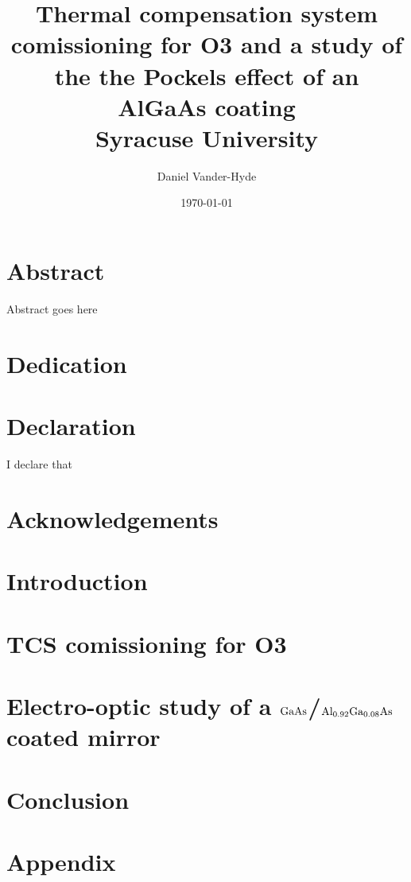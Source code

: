 \documentclass[12pt]{report}
\title{
{Thermal compensation system comissioning for O3 and a study of the
the Pockels effect of an AlGaAs coating}\\
{\large Syracuse University}\\
}
\author{Daniel Vander-Hyde}
\date{\today}
\newcommand{\algaas}{\mathrm{Al_{0.92}Ga_{0.08}As}}
\newcommand{\gaas}{\mathrm{GaAs}}
\begin{document}
\maketitle

\chapter*{Abstract}
Abstract goes here

\chapter*{Dedication}

\chapter*{Declaration}
I declare that

\chapter*{Acknowledgements}


\tableofcontents

\maketitle

\newpage


\chapter{Introduction}

\newpage

\chapter{TCS comissioning for O3}


\chapter{Electro-optic study of a $\protect\gaas$/$\protect\algaas$ coated mirror}


\chapter{Conclusion}

\newpage
\chapter{Appendix}




\end{document}
